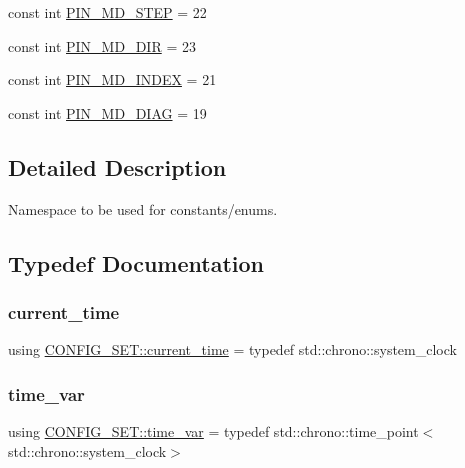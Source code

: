 \begin{DoxyCompactItemize}
\item 
const int \hyperlink{namespaceCONFIG__SET_a6ff1241febf3c05949aa4e9615126aaa}{P\+I\+N\+\_\+\+M\+D\+\_\+\+S\+T\+EP} = 22
\item 
const int \hyperlink{namespaceCONFIG__SET_a893c9a17e861d557ec6e6d009d02f1fd}{P\+I\+N\+\_\+\+M\+D\+\_\+\+D\+IR} = 23
\item 
const int \hyperlink{namespaceCONFIG__SET_a77c4124103e0be77050f54fed8f46cbe}{P\+I\+N\+\_\+\+M\+D\+\_\+\+I\+N\+D\+EX} = 21
\item 
const int \hyperlink{namespaceCONFIG__SET_a24d0005db5d888efec3ad54d1d21d319}{P\+I\+N\+\_\+\+M\+D\+\_\+\+D\+I\+AG} = 19
\end{DoxyCompactItemize}


\subsection{Detailed Description}
Namespace to be used for constants/enums. 

\subsection{Typedef Documentation}
\mbox{\label{namespaceCONFIG__SET_a7a1c6f926aead4885c03f1fbeee693ce}} 
\subsubsection{\texorpdfstring{current\+\_\+time}{current\_time}}
{\footnotesize\ttfamily using \hyperlink{namespaceCONFIG__SET_a7a1c6f926aead4885c03f1fbeee693ce}{C\+O\+N\+F\+I\+G\+\_\+\+S\+E\+T\+::current\+\_\+time} = typedef std\+::chrono\+::system\+\_\+clock}

\mbox{\label{namespaceCONFIG__SET_a8816a22e7885d027a52bfa0d24fa9008}} 
\subsubsection{\texorpdfstring{time\+\_\+var}{time\_var}}
{\footnotesize\ttfamily using \hyperlink{namespaceCONFIG__SET_a8816a22e7885d027a52bfa0d24fa9008}{C\+O\+N\+F\+I\+G\+\_\+\+S\+E\+T\+::time\+\_\+var} = typedef std\+::chrono\+::time\+\_\+point$<$std\+::chrono\+::system\+\_\+clock$>$}



